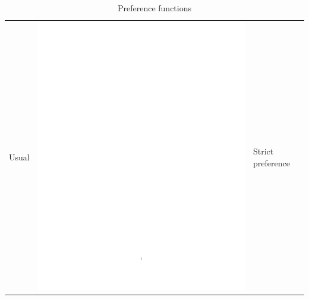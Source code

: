 \begin{enumerate}
\begin{table}[h!]
\caption{Preference functions}
\begin{center}
\begin{tabular}{|l|c|b{4.2cm}|}
\hline Usual & \includegraphics[page=2,trim=7.5cm 14cm 5cm 7cm,clip,scale=0.4]{prom_usual_pdf} & Strict preference\\

\end{tabular}
\end{center}
\end{table}
\end{enumerate}

